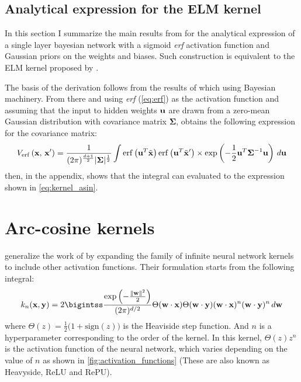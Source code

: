 \subsection{Analytical expression for the ELM kernel}

In this section I summarize the main results from
\textcite{williamsComputationInfiniteNeural1998} for the analytical expression
of a single layer bayesian network with a sigmoid \emph{erf} activation function
and Gaussian priors on the weights and biases. Such construction is equivalent
to the ELM kernel proposed by
\textcite{frenayParameterinsensitiveKernelExtreme2011}.

The basis of the derivation follows from the results of
\textcite{mackayBayesianMethodsAdaptive1999,nealBayesianTrainingBackpropagation1992}
which using Bayesian machinery. From there and using \emph{erf} (\cref{eq:erf})
as the activation function and assuming that the input to hidden weights
$\textbf u$ are drawn from a zero-mean Gaussian distribution with covariance
matrix $\boldsymbol\Sigma$, \citeauthor{williamsComputationInfiniteNeural1998}
obtains the following expression for the covariance matrix:
\begin{equation}\label{eq:integral_williams}
    V_{\operatorname{erf}}\left(\mathbf{x},\,\mathbf{x}'\right) = \frac{1}{(2\pi)^{\frac{d+1}{2}}|\boldsymbol\Sigma|^{\frac{1}{2}}}
    \int
    \operatorname{erf} \left(\textbf u^T \tilde {\mathbf{x}}\right)
    \operatorname{erf} \left(\textbf u^T \tilde {\mathbf{x}}'\right) \times \exp \left(
    -\frac{1}{2} \textbf u^T \boldsymbol\Sigma^{-1} \textbf u
    \right) \,d\textbf u
\end{equation}
then, in the appendix, \citeauthor{williamsComputationInfiniteNeural1998} shows
that the integral can evaluated to the expression shown in
\cref{eq:kernel_asin}.


\section{Arc-cosine kernels}%
\label{sec:arc_cosine_kernels}

\Textcite{choLargemarginClassificationInfinite2010} generalize the work of
\textcite{williamsComputationInfiniteNeural1998} by expanding the family of
infinite neural network kernels to include other activation functions. Their
formulation starts from the following integral:
\begin{equation}\label{eq:integral_cho}
    k_n(\x, \y) = 2 \bigintss \frac{\exp\left(-\frac{\lVert \textbf w \rVert^2}{2}\right)}{(2\pi)^{d/2}}
    \Theta(\textbf w \cdot \x) \Theta(\textbf w \cdot \y) (\textbf w \cdot \x)^n (\textbf w \cdot \y)^n \,d\textbf w
\end{equation}
where $\Theta(z) = \frac{1}{2} \bigl(1 + \text{sign}(z)\bigr)$ is the Heaviside
step function. And $n$ is a hyperparameter corresponding to the order of the
kernel. In this kernel, $\Theta(z)z^n$ is the activation function of the neural
network, which varies depending on the value of $n$ as shown in
\cref{fig:activation_functions} (These are also known as Heavyside, ReLU and RePU).

